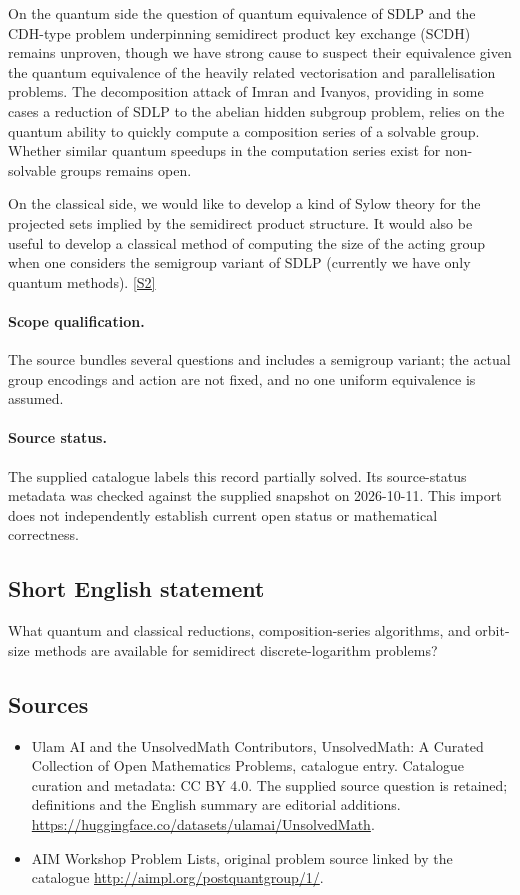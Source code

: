 \documentclass[11pt]{article}
\begin{document}
On the quantum side the question of quantum equivalence of SDLP and the CDH-type problem underpinning semidirect product key exchange (SCDH) remains unproven, though we have strong cause to suspect their equivalence given the quantum equivalence of the heavily related vectorisation and parallelisation problems. The decomposition attack of Imran and Ivanyos, providing in some cases a reduction of SDLP to the abelian hidden subgroup problem, relies on the quantum ability to quickly compute a composition series of a solvable group. Whether similar quantum speedups in the computation series exist for non-solvable groups remains open.

On the classical side, we would like to develop a kind of Sylow theory for the projected sets implied by the semidirect product structure. It would also be useful to develop a classical method of computing the size of the acting group when one considers the semigroup variant of SDLP (currently we have only quantum methods). \href{http://aimpl.org/postquantgroup/1/}{[S2]}
\paragraph{Scope qualification.}
The source bundles several questions and includes a semigroup variant; the actual group encodings and action are not fixed, and no one uniform equivalence is assumed.
\paragraph{Source status.}
The supplied catalogue labels this record partially solved. Its source-status metadata was checked against the supplied snapshot on 2026-10-11. This import does not independently establish current open status or mathematical correctness.
\subsection{Short English statement}
What quantum and classical reductions, composition-series algorithms, and orbit-size methods are available for semidirect discrete-logarithm problems?
\subsection{Sources}
\begin{itemize}
\item[S1] Ulam AI and the UnsolvedMath Contributors, UnsolvedMath: A Curated Collection of Open Mathematics Problems, catalogue entry. Catalogue curation and metadata: CC BY 4.0. The supplied source question is retained; definitions and the English summary are editorial additions.
\url{https://huggingface.co/datasets/ulamai/UnsolvedMath}.
\item[S2] AIM Workshop Problem Lists, original problem source linked by the catalogue
\url{http://aimpl.org/postquantgroup/1/}.
\end{itemize}
\end{document}
